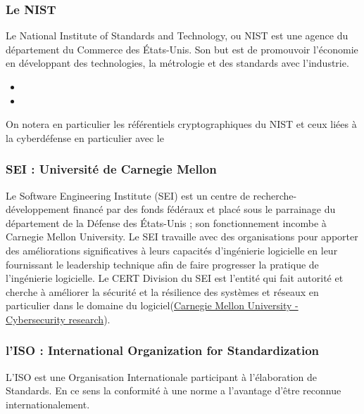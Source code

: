 \subsubsection{Le NIST}
Le National Institute of Standards and Technology, ou NIST est une agence du département du Commerce des États-Unis. Son but est de promouvoir l'économie en développant des technologies, la métrologie et des standards avec l'industrie. 

\begin{itemize}
  \item {}
  \item {}
\end{itemize}

On notera en particulier les référentiels cryptographiques du NIST et ceux liées à la cyberdéfense en particulier avec le 

\subsubsection{SEI : Université de Carnegie Mellon}

Le Software Engineering Institute (SEI) est un centre de recherche-développement financé par des fonds fédéraux et placé sous le parrainage du département de la Défense des États-Unis ; son fonctionnement incombe à Carnegie Mellon University. Le SEI travaille avec des organisations pour apporter des améliorations significatives à leurs capacités d’ingénierie logicielle en leur fournissant le leadership technique afin de faire progresser la pratique de l’ingénierie logicielle. Le CERT Division du SEI est l’entité qui fait autorité et cherche à améliorer la sécurité et la résilience des systèmes et réseaux en particulier dans le domaine du logiciel(\href{https://www.sei.cmu.edu/research-capabilities/cybersecurity/}{Carnegie Mellon University - Cybersecurity research}).

\subsubsection{l'ISO : International Organization for Standardization }


L’ISO est une Organisation Internationale participant à l’élaboration de Standards. En ce sens la conformité à une norme a l’avantage d’être reconnue internationalement.
 
